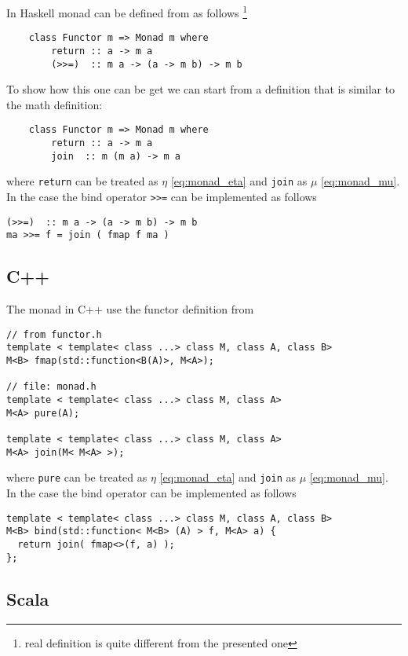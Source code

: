 \begin{example}
\label{ex:monad_haskell}
In Haskell monad can be defined from  as follows 
\footnote{real definition is quite different from the presented one}
\begin{verbatim}
    class Functor m => Monad m where
        return :: a -> m a
        (>>=)  :: m a -> (a -> m b) -> m b
\end{verbatim} 

To show how this one can be get we can start from a definition that is
similar to the math definition:
\begin{verbatim}
    class Functor m => Monad m where
        return :: a -> m a
        join  :: m (m a) -> m a
\end{verbatim} 
where \texttt{return} can be treated as $\eta$
\eqref{eq:monad_eta} and 
\texttt{join} as $\mu$ \eqref{eq:monad_mu}. In the case
the bind operator \texttt{>>=} can be implemented as follows
\begin{verbatim}
(>>=)  :: m a -> (a -> m b) -> m b
ma >>= f = join ( fmap f ma )
\end{verbatim} 

\end{example}

\subsection{C++}
The monad in C++ use the functor definition from 
\begin{verbatim}
// from functor.h
template < template< class ...> class M, class A, class B> 
M<B> fmap(std::function<B(A)>, M<A>);

// file: monad.h
template < template< class ...> class M, class A> 
M<A> pure(A);

template < template< class ...> class M, class A> 
M<A> join(M< M<A> >);
\end{verbatim}
where \texttt{pure} can be treated as $\eta$
\eqref{eq:monad_eta} and 
\texttt{join} as $\mu$ \eqref{eq:monad_mu}. In the case
the bind operator can be implemented as follows
\begin{verbatim}
template < template< class ...> class M, class A, class B> 
M<B> bind(std::function< M<B> (A) > f, M<A> a) {
  return join( fmap<>(f, a) );
};
\end{verbatim}

\subsection{Scala}

